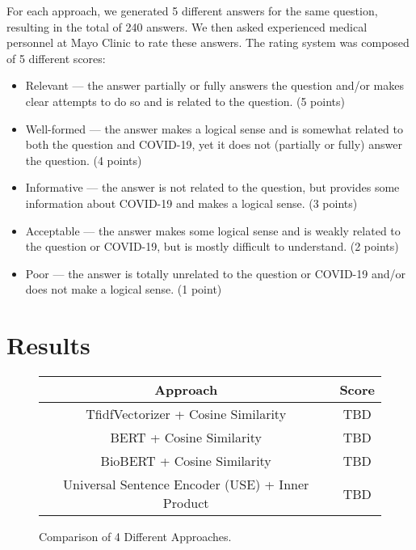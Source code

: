 \documentclass[sigconf,natbib=false]{acmart}
\begin{document}
\noindent For each approach, we generated 5 different answers for the same
question, resulting in the total of 240 answers. We then asked experienced
medical personnel at Mayo Clinic to rate these answers. The rating system was
composed of 5 different scores:

\begin{itemize}
  \item	Relevant --- the answer partially or fully answers the question and/or
        makes clear attempts to do so and is related to the question.
        (5 points)

  \item	Well-formed --- the answer makes a logical sense and is somewhat
        related to both the question and COVID-19, yet it does not (partially
        or fully) answer the question.
        (4 points)

  \item	Informative --- the answer is not related to the question, but provides
        some information about COVID-19 and makes a logical sense.
        (3 points)

  \item	Acceptable --- the answer makes some logical sense and is weakly
        related to the question or COVID-19, but is mostly difficult to
        understand.
        (2 points)

  \item	Poor --- the answer is totally unrelated to the question or COVID-19
        and/or does not make a logical sense.
        (1 point)
\end{itemize}


\section{Results}

\begin{figure}[H]
  \centering
  \begin{tabular}{*{2}{c}}
    \toprule
    Approach & Score\\
    \midrule
    TfidfVectorizer + Cosine Similarity & TBD\\
    \midrule
    BERT + Cosine Similarity & TBD\\
    \midrule
    BioBERT + Cosine Similarity & TBD\\
    \midrule
    Universal Sentence Encoder (USE) + Inner Product & TBD\\
    \bottomrule
  \end{tabular}
  \caption{Comparison of 4 Different Approaches.}
\end{figure}
\end{document}
